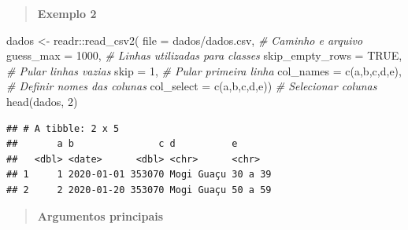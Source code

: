 \documentclass[
]{book}
\newenvironment{Shaded}{\begin{snugshade}}{\end{snugshade}}
\newcommand{\AttributeTok}[1]{\textcolor[rgb]{0.77,0.63,0.00}{#1}}
\newcommand{\CommentTok}[1]{\textcolor[rgb]{0.56,0.35,0.01}{\textit{#1}}}
\newcommand{\ConstantTok}[1]{\textcolor[rgb]{0.00,0.00,0.00}{#1}}
\newcommand{\DecValTok}[1]{\textcolor[rgb]{0.00,0.00,0.81}{#1}}
\newcommand{\FunctionTok}[1]{\textcolor[rgb]{0.00,0.00,0.00}{#1}}
\newcommand{\NormalTok}[1]{#1}
\newcommand{\OtherTok}[1]{\textcolor[rgb]{0.56,0.35,0.01}{#1}}
\newcommand{\SpecialCharTok}[1]{\textcolor[rgb]{0.00,0.00,0.00}{#1}}
\newcommand{\StringTok}[1]{\textcolor[rgb]{0.31,0.60,0.02}{#1}}
\theoremstyle{definition}
\theoremstyle{definition}
\theoremstyle{definition}
\theoremstyle{definition}
\theoremstyle{remark}
\begin{document}
\begin{quote}
\textbf{Exemplo 2}
\end{quote}

\begin{Shaded}
\begin{Highlighting}[]
\NormalTok{dados }\OtherTok{\textless{}{-}}\NormalTok{ readr}\SpecialCharTok{::}\FunctionTok{read\_csv2}\NormalTok{(}
              \AttributeTok{file =} \StringTok{\textquotesingle{}dados/dados.csv\textquotesingle{}}\NormalTok{,   }\CommentTok{\# Caminho e arquivo}
              \AttributeTok{guess\_max =} \DecValTok{1000}\NormalTok{,           }\CommentTok{\# Linhas utilizadas para classes}
              \AttributeTok{skip\_empty\_rows =} \ConstantTok{TRUE}\NormalTok{,     }\CommentTok{\# Pular linhas vazias}
              \AttributeTok{skip =} \DecValTok{1}\NormalTok{,                   }\CommentTok{\# Pular primeira linha}
              \AttributeTok{col\_names =} \FunctionTok{c}\NormalTok{(}\StringTok{\textquotesingle{}a\textquotesingle{}}\NormalTok{,}\StringTok{\textquotesingle{}b\textquotesingle{}}\NormalTok{,}\StringTok{\textquotesingle{}c\textquotesingle{}}\NormalTok{,}\StringTok{\textquotesingle{}d\textquotesingle{}}\NormalTok{,}\StringTok{\textquotesingle{}e\textquotesingle{}}\NormalTok{),   }\CommentTok{\# Definir nomes das colunas}
              \AttributeTok{col\_select =} \FunctionTok{c}\NormalTok{(}\StringTok{\textquotesingle{}a\textquotesingle{}}\NormalTok{,}\StringTok{\textquotesingle{}b\textquotesingle{}}\NormalTok{,}\StringTok{\textquotesingle{}c\textquotesingle{}}\NormalTok{,}\StringTok{\textquotesingle{}d\textquotesingle{}}\NormalTok{,}\StringTok{\textquotesingle{}e\textquotesingle{}}\NormalTok{))  }\CommentTok{\# Selecionar colunas}
\FunctionTok{head}\NormalTok{(dados, }\DecValTok{2}\NormalTok{)}
\end{Highlighting}
\end{Shaded}

\begin{verbatim}
## # A tibble: 2 x 5
##       a b               c d          e      
##   <dbl> <date>      <dbl> <chr>      <chr>  
## 1     1 2020-01-01 353070 Mogi Guaçu 30 a 39
## 2     2 2020-01-20 353070 Mogi Guaçu 50 a 59
\end{verbatim}

\begin{quote}
\textbf{Argumentos principais}
\end{quote}
\end{document}
